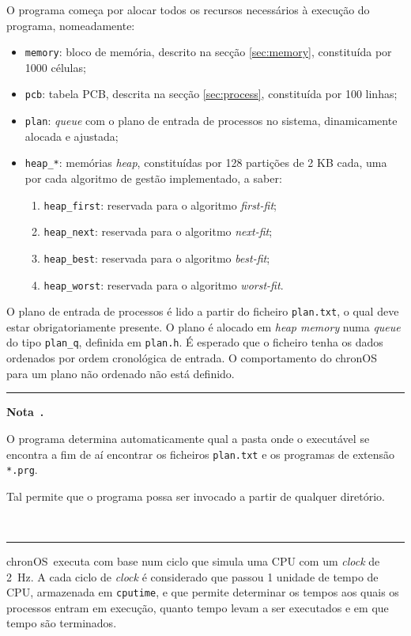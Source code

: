 \documentclass[10pt,oneside]{estiloUBI}
\newcommand{\chronOS}{\textsf{chronOS}}
\newcounter{note}
\newenvironment{note}[1][]
	{
		\medskip \refstepcounter{note} \par \medskip
		\noindent\textcolor[RGB]{220,220,220}{\rule{\linewidth}{0.4pt}}
		\noindent \textbf{Nota~\thenote. #1} \rmfamily
	}
	{
		\\ \noindent\textcolor[RGB]{220,220,220}{\rule{\linewidth}{0.4pt}} \medskip
	}
\begin{document}
	O programa começa por alocar todos os recursos necessários à execução do programa, nomeadamente:
	
	\begin{itemize}
		\item \verb|memory|: bloco de memória, descrito na secção \ref{sec:memory}, constituída por 1000 células;
		\item \verb|pcb|: tabela \ac{PCB}, descrita na secção \ref{sec:process}, constituída por 100 linhas;
		\item \verb|plan|: \textit{queue} com o plano de entrada de processos no sistema, dinamicamente alocada e ajustada;
		\item \verb|heap_*|: memórias \textit{heap}, constituídas por 128 partições de 2 KB cada, uma por cada algoritmo de gestão implementado, a saber:
		\begin{enumerate}
			\item \verb|heap_first|: reservada para o algoritmo \textit{first-fit};
			\item \verb|heap_next|: reservada para o algoritmo \textit{next-fit};
			\item \verb|heap_best|: reservada para o algoritmo \textit{best-fit};
			\item \verb|heap_worst|: reservada para o algoritmo \textit{worst-fit}.
		\end{enumerate}
	\end{itemize}

	O plano de entrada de processos é lido a partir do ficheiro \texttt{plan.txt}, o qual deve estar obrigatoriamente presente. O plano é alocado em \textit{heap memory} numa \textit{queue} do tipo \verb|plan_q|, definida em \verb|plan.h|. É esperado que o ficheiro tenha os dados ordenados por ordem cronológica de entrada. O comportamento do \chronOS~ para um plano não ordenado não está definido.
	
	\begin{note}
		O programa determina automaticamente qual a pasta onde o executável se encontra a fim de aí encontrar os ficheiros \verb|plan.txt| e os programas de extensão \verb|*.prg|.

		Tal permite que o programa possa ser invocado a partir de qualquer diretório.
	\end{note}
	
	\chronOS~executa com base num ciclo que simula uma \ac{CPU} com um \textit{clock} de \SI{2}{\hertz}. A cada ciclo de \textit{clock} é considerado que passou 1 unidade de tempo de \ac{CPU}, armazenada em \verb|cputime|, e que permite determinar os tempos aos quais os processos entram em execução, quanto tempo levam a ser executados e em que tempo são terminados.
	
\end{document}
